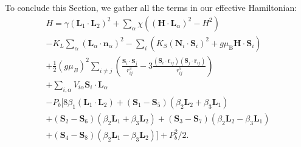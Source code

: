 \\\\
To conclude this Section, we gather all the terms in our effective Hamiltonian:
\begin{multline}
    \label{eq:GdMn2O5_model}
    H=\gamma(\bm{L}_1\cdot \bm{L}_2)^2 +\sum_{\alpha}\chi((\bm{H}\cdot \bm{L}_\alpha)^2-H^2)\\
    -K_L\sum_\alpha(\bm{L}_\alpha\cdot \bm{n}_\alpha)^2 -\sum_i\left( K_S(\bm{N}_i\cdot \bm S_i)^2+ g\mu_\mathrm{B} \bm{H} \cdot \bm{S}_i\right) \\
    + \frac{1}{2}(g \mu_B)^2\sum_{i\neq j}\left(\frac{\bm S_i\cdot \bm S_j}{r_{ij}^3}-3\frac{(\bm S_i\cdot \bm{r}_{ij})(\bm S_j\cdot \bm{r}_{ij})}{r_{ij}^5}\right)
     \\+ \sum_{i,\alpha}V_{i\alpha}\bm{S}_i\cdot \bm{L}_\alpha \\
    -P_b[8 \beta_1 (\bm{L}_1\cdot \bm{L}_2)+(\bm{S}_1-\bm{S}_5)(\beta_2 \bm{L}_2 + \beta_3 \bm{L}_1) \\+ (\bm{S}_2-\bm{S}_6)(\beta_2 \bm{L}_1 + \beta_3 \bm{L}_2)
    + (\bm{S}_3-\bm{S}_7)(\beta_2 \bm{L}_2 - \beta_3 \bm{L}_1) \\
    +(\bm{S}_4-\bm{S}_8)(\beta_2 \bm{L}_1 - \beta_3 \bm{L}_2)]
    + P_b^2/2.
\end{multline}


